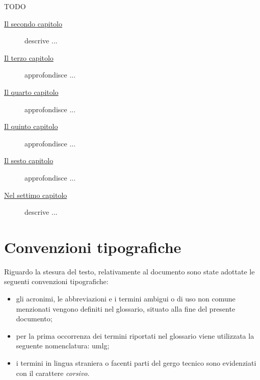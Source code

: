 {\Huge TODO}
\begin{description}
    \item[{\hyperref[cap:processi-metodologie]{Il secondo capitolo}}] descrive ...  
    
    \item[{\hyperref[cap:descrizione-stage]{Il terzo capitolo}}] approfondisce ...
    
    \item[{\hyperref[cap:analisi-requisiti]{Il quarto capitolo}}] approfondisce ...
    
    \item[{\hyperref[cap:progettazione-codifica]{Il quinto capitolo}}] approfondisce ...
    
    \item[{\hyperref[cap:verifica-validazione]{Il sesto capitolo}}] approfondisce ...
    
    \item[{\hyperref[cap:conclusioni]{Nel settimo capitolo}}] descrive ...
\end{description}

\section{Convenzioni tipografiche}
Riguardo la stesura del testo, relativamente al documento sono state adottate le seguenti convenzioni tipografiche:
\begin{itemize}
	\item gli acronimi, le abbreviazioni e i termini ambigui o di uso non comune menzionati vengono definiti nel glossario, situato alla fine del presente documento;
	\item per la prima occorrenza dei termini riportati nel glossario viene utilizzata la seguente nomenclatura: \gls{umlg};
	\item i termini in lingua straniera o facenti parti del gergo tecnico sono evidenziati con il carattere \emph{corsivo}.
\end{itemize}